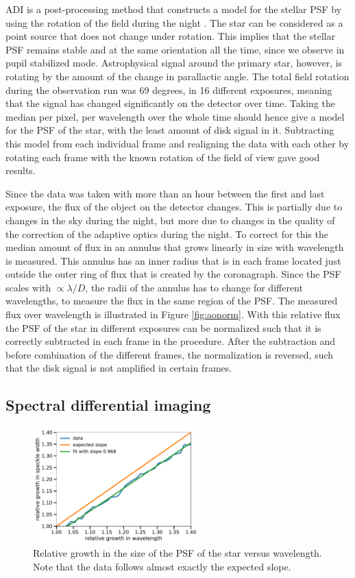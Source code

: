 \documentclass[twoside,single]{lion-msc}
\begin{document}
ADI is a post-processing method that constructs a model for the stellar PSF by using the rotation of the field during the night \cite{Marois2006}. The star can be considered as a point source that does not change under rotation. This implies that the stellar PSF remains stable and at the same orientation all the time, since we observe in pupil stabilized mode. Astrophysical signal around the primary star, however, is rotating by the amount of the change in parallactic angle. The total field rotation during the observation run was 69 degrees, in 16 different exposures, meaning that the signal has changed significantly on the detector over time. Taking the median per pixel, per wavelength over the whole time should hence give a model for the PSF of the star, with the least amount of disk signal in it. Subtracting this model from each individual frame and realigning the data with each other by rotating each frame with the known rotation of the field of view gave good results. 
\bigskip

Since the data was taken with more than an hour between the first and last exposure, the flux of the object on the detector changes. This is partially due to changes in the sky during the night, but more due to changes in the quality of the correction of the adaptive optics during the night. To correct for this the median amount of flux in an annulus that grows linearly in size with wavelength is measured. This annulus has an inner radius that is in each frame located just outside the outer ring of flux that is created by the coronagraph. Since the PSF scales with $ \propto\lambda/D$, the radii of the annulus has to change for different wavelengths, to measure the flux in the same region of the PSF. The measured flux over wavelength is illustrated in Figure \ref{fig:aonorm}. With this relative flux the PSF of the star in different exposures can be normalized such that it is correctly subtracted in each frame in the procedure. After the subtraction and before combination of the different frames, the normalization is reversed, such that the disk signal is not amplified in certain frames.

\subsection{Spectral differential imaging}
\begin{figure}
\centering
\includegraphics[width = 0.57\textwidth]{specklegrowth}
\caption{Relative growth in the size of the PSF of the star versus wavelength. Note that the data follows almost exactly the expected slope.}
\label{fig:specklegrowth}
\end{figure}
\end{document}

